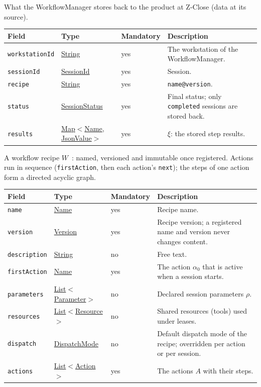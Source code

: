 \documentclass[a4paper]{arrowhead}
\newcommand{\mref}[1]{{\textcolor{ArrowheadPurple}{\hyperref[sec:model:#1]{#1}}}}
\newcommand{\pref}[1]{{\textcolor{ArrowheadGrey}{\hyperref[sec:model:primitives:#1]{#1}}}}
\begin{document}
What the WorkflowManager stores back to the product at Z-Close (data at its source).

{\small
\begin{longtable}{|p{3.7cm}|p{4.2cm}|p{1.6cm}|p{6.3cm}|}

\hline
\rowcolor{gray!33} Field & Type & Mandatory & Description \\ \hline
\endhead
\texttt{workstationId} & \pref{String} & yes & The workstation of the WorkflowManager. \\ \hline
\texttt{sessionId} & \pref{SessionId} & yes & Session. \\ \hline
\texttt{recipe} & \pref{String} & yes & \texttt{name@version}. \\ \hline
\texttt{status} & \mref{SessionStatus} & yes & Final status; only \texttt{completed} sessions are stored back. \\ \hline
\texttt{results} & \pref{Map}$<$\pref{Name}, \pref{JsonValue}$>$ & yes & $\xi$: the stored step results. \\ \hline
\end{longtable}
}

A workflow recipe $W$~\cite{varga2026}: named, versioned and immutable once registered. Actions run in sequence (\texttt{firstAction}, then each action's \texttt{next}); the steps of one action form a directed acyclic graph.

{\small
\begin{longtable}{|p{3.7cm}|p{4.2cm}|p{1.6cm}|p{6.3cm}|}

\hline
\rowcolor{gray!33} Field & Type & Mandatory & Description \\ \hline
\endhead
\texttt{name} & \pref{Name} & yes & Recipe name. \\ \hline
\texttt{version} & \pref{Version} & yes & Recipe version; a registered name and version never changes content. \\ \hline
\texttt{description} & \pref{String} & no & Free text. \\ \hline
\texttt{firstAction} & \pref{Name} & yes & The action $\alpha_0$ that is active when a session starts. \\ \hline
\texttt{parameters} & \pref{List}$<$\mref{Parameter}$>$ & no & Declared session parameters $\rho$. \\ \hline
\texttt{resources} & \pref{List}$<$\mref{Resource}$>$ & no & Shared resources (tools) used under leases. \\ \hline
\texttt{dispatch} & \mref{DispatchMode} & no & Default dispatch mode of the recipe; overridden per action or per session. \\ \hline
\texttt{actions} & \pref{List}$<$\mref{Action}$>$ & yes & The actions $A$ with their steps. \\ \hline
\end{longtable}
}
\end{document}
